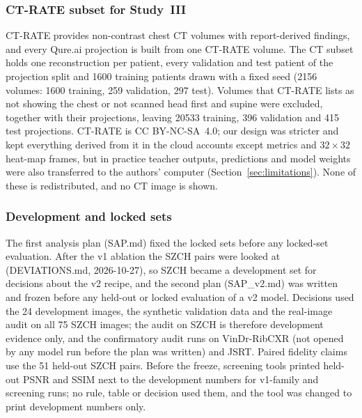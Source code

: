 \subsubsection{CT-RATE subset for Study~III}
CT-RATE \cite{hamamci2026ctrate} provides non-contrast chest CT volumes with report-derived findings, and every Qure.ai projection is built
from one CT-RATE volume. The CT subset holds one reconstruction per patient, every validation and test patient of the projection split and
\num{1600} training patients drawn with a fixed seed (\num{2156} volumes: \num{1600} training, 259 validation, 297 test). Volumes that
CT-RATE lists as not showing the chest or not scanned head first and supine were excluded, together with their projections, leaving
\num{20533} training, 396 validation and 415 test projections. CT-RATE is CC BY-NC-SA~4.0; our design was stricter and kept everything
derived from it in the cloud accounts except metrics and $32\times32$ heat-map frames, but in practice teacher outputs, predictions and
model weights were also transferred to the authors' computer (Section~\ref{sec:limitations}). None of these is redistributed, and no CT
image is shown.

\subsubsection{Development and locked sets}
The first analysis plan (SAP.md) fixed the locked sets before any locked-set evaluation. After the v1 ablation the SZCH pairs were looked
at (DEVIATIONS.md, 2026-10-27), so SZCH became a development set for decisions about the v2 recipe, and the second plan (SAP\_v2.md) was
written and frozen before any held-out or locked evaluation of a v2 model. Decisions used the 24 development images, the synthetic
validation data and the real-image audit on all 75 SZCH images; the audit on SZCH is therefore development evidence only, and the
confirmatory audit runs on VinDr-RibCXR (not opened by any model run before the plan was written) and JSRT. Paired fidelity claims use the
51 held-out SZCH pairs. Before the freeze, screening tools printed held-out PSNR and SSIM next to the development numbers for v1-family
and screening runs; no rule, table or decision used them, and the tool was changed to print development numbers only.


